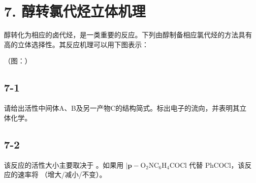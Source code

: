 \section*{7. 醇转氯代烃立体机理}
醇转化为相应的⻧代烃，是⼀类重要的反应。下列由醇制备相应氯代烃的⽅法具有⾼的⽴体选择性。其反应机理可以⽤下图表⽰：

（图：）

\subsection*{7-1}
请给出活性中间体A、B及另⼀产物C的结构简式。标出电⼦的流向，并表明其⽴体化学。

\subsection*{7-2}
该反应的活性⼤⼩主要取决于 。如果⽤ $\mathrm { | { \boldsymbol { p } } { - } \mathrm { { O } } _ { 2 } N \mathrm { { C } } _ { 6 } H _ { 4 } C O C l }$ 代替 PhCOCl，该反应的速率将 （增⼤/减⼩/不变）。
